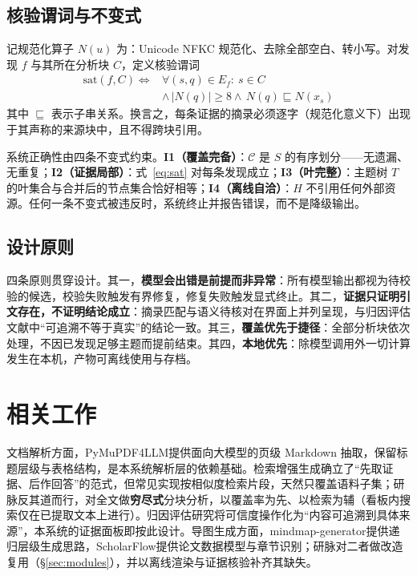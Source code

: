 \documentclass[11pt]{article}
\begin{document}
\subsection{核验谓词与不变式}

记规范化算子 $N(u)$ 为：Unicode NFKC 规范化、去除全部空白、转小写。对发现 $f$ 与其所在分析块 $C$，定义核验谓词
\begin{equation}
\begin{split}
\mathrm{sat}(f,C)\iff{} & \forall(s,q)\in E_f:\ s\in C\\
 & \wedge\, |N(q)|\ge 8 \wedge\, N(q)\sqsubseteq N(x_s)
\end{split}
\label{eq:sat}
\end{equation}
其中 $\sqsubseteq$ 表示子串关系。换言之，每条证据的摘录必须逐字（规范化意义下）出现于其声称的来源块中，且不得跨块引用。

系统正确性由四条不变式约束。\textbf{I1（覆盖完备）}：$\mathcal{C}$ 是 $S$ 的有序划分——无遗漏、无重复；\textbf{I2（证据局部）}：式~\eqref{eq:sat} 对每条发现成立；\textbf{I3（叶完整）}：主题树 $T$ 的叶集合与合并后的节点集合恰好相等；\textbf{I4（离线自洽）}：$H$ 不引用任何外部资源。任何一条不变式被违反时，系统终止并报告错误，而不是降级输出。

\subsection{设计原则}

四条原则贯穿设计。其一，\textbf{模型会出错是前提而非异常}：所有模型输出都视为待校验的候选，校验失败触发有界修复，修复失败触发显式终止。其二，\textbf{证据只证明引文存在，不证明结论成立}：摘录匹配与语义待核对在界面上并列呈现，与归因评估文献中“可追溯不等于真实”的结论一致\citep{rashkin2023measuring}。其三，\textbf{覆盖优先于捷径}：全部分析块依次处理，不因已发现足够主题而提前结束。其四，\textbf{本地优先}：除模型调用外一切计算发生在本机，产物可离线使用与存档。

\section{相关工作}

文档解析方面，PyMuPDF4LLM\citep{pymupdf4llm}提供面向大模型的页级 Markdown 抽取，保留标题层级与表格结构，是本系统解析层的依赖基础。检索增强生成\citep{lewis2020rag}确立了“先取证据、后作回答”的范式，但常见实现按相似度检索片段，天然只覆盖语料子集；研脉反其道而行，对全文做\textbf{穷尽式}分块分析，以覆盖率为先、以检索为辅（看板内搜索仅在已提取文本上进行）。归因评估研究将可信度操作化为“内容可追溯到具体来源”\citep{rashkin2023measuring}，本系统的证据面板即按此设计。导图生成方面，mindmap-generator\citep{mindmapgen}提供递归层级生成思路，ScholarFlow\citep{scholarflow}提供论文数据模型与章节识别；研脉对二者做改造复用（\S\ref{sec:modules}），并以离线渲染与证据核验补齐其缺失。
\end{document}
